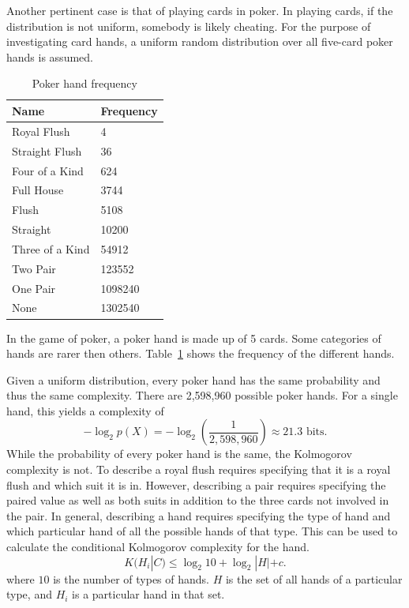 Another pertinent case is that of playing cards in poker.
In playing cards, if the distribution is not uniform, somebody is likely cheating.
For the purpose of investigating card hands, a uniform random distribution over all five-card poker hands is assumed.

\begin{table}
    \begin{center}
    \begin{tabular}{ll}
        Name & Frequency \\
        \hline
        Royal Flush & 4 \\
        Straight Flush & 36 \\
        Four of a Kind & 624 \\
          Full House & 3744 \\
               Flush & 5108 \\
            Straight & 10200 \\
     Three of a Kind & 54912 \\
            Two Pair & 123552 \\
            One Pair & 1098240 \\
            None & 1302540 \\
    \end{tabular}
    \end{center}
    \caption{Poker hand frequency}
    \label{poker}
\end{table}
In the game of poker,
a poker hand is made up of 5 cards.
Some categories of hands are rarer then others.
Table~\ref{poker} shows the frequency of the different hands.

Given a uniform distribution, every poker hand has the same probability and thus the same complexity.
There are 2,598,960 possible poker hands. 
For a single hand, this yields a complexity of
\begin{equation}
    -\log_2{p(X)} = -\log_2(\frac{1}{2,598,960}) \approx 21.3 \mbox{ bits.}
\end{equation}
While the probability of every poker hand is the same, the Kolmogorov complexity is not.
To describe a royal flush requires specifying that it is a royal flush and which suit it is in.
However, describing a pair requires specifying the paired value as well as both suits in addition to the three cards not involved in the pair.
In general, describing a hand requires specifying the type of hand and which particular hand of all the possible hands of that type.
This can be used to calculate the conditional Kolmogorov complexity for the hand.
\begin{equation}
    \label{kc.card}
    K(H_i|C) \leq \log_2 10 + \log_2 |H| + c \mbox{.}
\end{equation} where $10$ is the number of types of hands. $H$ is the set of all hands of a particular type, and $H_i$ is a particular hand in that set.

